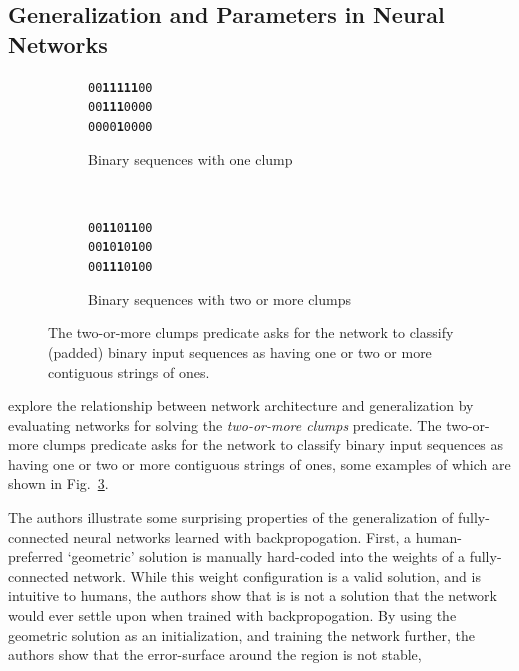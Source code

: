 \documentclass[thesis]{subfiles}
\begin{document}
	\subsection{Generalization and Parameters in Neural Networks}
	\begin{figure}[tb]
		\centering
		\large
        \renewcommand{\ttdefault}{pcr}
		\begin{subfigure}[t]{0.45\textwidth}
			\begin{center}
			\texttt{00\textbf{11111}00}\\
			\texttt{00\textbf{111}0000}\\
			\texttt{0000\textbf{1}0000}
			\end{center}
			\caption{Binary sequences with one clump}
			\label{fig:oneclump}
		\end{subfigure}
		~
		\begin{subfigure}[t]{0.45\textwidth}
			\begin{center}
			\texttt{00\textbf{11}0\textbf{11}00}\\
			\texttt{00\textbf{1}0\textbf{1}0\textbf{1}00}\\
			\texttt{00\textbf{111}0\textbf{1}00}
			\end{center}
			\caption{Binary sequences with two or more clumps}
			\label{fig:polyfit20th}
		\end{subfigure}
		
        \renewcommand{\ttdefault}{lmodern}
		\caption[Two-or-more Clump Predicate]{The two-or-more clumps predicate asks for the network to classify (padded) binary input sequences as having one or two or more contiguous strings of ones.}
		\label{fig:tomclumps}
	\end{figure}
	
	\citet{denker1987large} explore the relationship between network architecture and generalization by evaluating networks for solving the \emph{two-or-more clumps} predicate. The two-or-more clumps predicate asks for the network to classify binary input sequences as having one or two or more contiguous strings of ones, some examples of which are shown in Fig.~\ref{fig:tomclumps}. 
	
	The authors illustrate some surprising properties of the generalization of fully-connected neural networks learned with backpropogation. First, a human-preferred `geometric' solution is manually hard-coded into the weights of a fully-connected network. While this weight configuration is a valid solution, and is intuitive to humans, the authors show that is is not a solution that the network would ever settle upon when trained with backpropogation. By using the geometric solution as an initialization, and training the network further, the authors show that the error-surface around the region is not stable,
	
\end{document}
